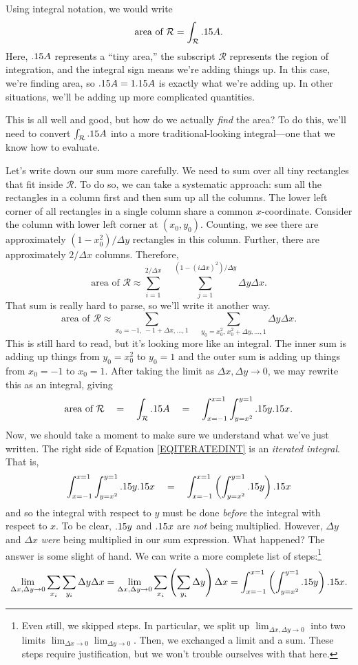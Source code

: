 Using integral notation, we would write
\[
	\text{area of }\mathcal R=\int_{\mathcal R} .15 A.
\]
Here, $.15 A$ represents a ``tiny area,'' the subscript $\mathcal R$ represents the region of integration,
and the integral sign means we're adding things up.  In this case, we're finding area, so $.15 A=1.15 A$ is
exactly what we're adding up.  In other situations, we'll be adding up more complicated quantities.

This is all well and good, but how do we actually \emph{find} the area?  To do this, we'll
need to convert $\int_{\mathcal R}.15 A$ into a more traditional-looking integral---one that we
know how to evaluate.

Let's write down our sum more carefully.  We need to sum over all tiny rectangles that fit inside
$\mathcal R$.  To do so, we can take a systematic approach: sum all the rectangles
in a column first and then sum up all the columns.  The lower left corner of all 
rectangles in a single column share a common $x$-coordinate.  Consider
the column with lower left corner at $(x_0,y_0)$.  Counting, we see there
are approximately $(1-x_0^2)/\Delta y$ rectangles in this column.  Further, there are approximately
$2/\Delta x$ columns.  Therefore,
\[
	\text{area of }\mathcal R\approx 
	\sum_{i=1}^{2/\Delta x}\quad\sum_{j=1}^{(1-(i\Delta x)^2)/\Delta y} \Delta y\Delta x.
\]
That sum is really hard to parse, so we'll write it another way.
\[
	\text{area of }\mathcal R\approx
	\sum_{x_0=-1,\,-1+\Delta x,\ldots,1}
	\quad
	\sum_{y_0=x_0^2,\,x_0^2+\Delta y,\ldots,1}
	\Delta y\Delta x.
\]
This is still hard to read, but it's looking more like an integral.  The inner sum
is adding up things from $y_0=x_0^2$ to $y_0=1$ and the outer sum is adding up
things from $x_0=-1$ to $x_0=1$.  After taking the limit
as $\Delta x,\Delta y\to 0$, we may rewrite this as an
integral, giving
\begin{equation}
	\label{EQITERATEDINT}
	\text{area of }\mathcal R\quad
	=\quad
	\int_{\mathcal R}.15 A \quad =\quad \int_{x=-1}^{x=1}\int_{y=x^2}^{y=1} .15 y.15 x.
\end{equation}
Now, we should take a moment to make sure we understand what we've just written.  The
right side of Equation \eqref{EQITERATEDINT} is an \emph{iterated integral}.
That is,
\[
	\int_{x=-1}^{x=1}\int_{y=x^2}^{y=1} .15 y.15 x
	\quad 
	=
	\quad \int_{x=-1}^{x=1}\left(\int_{y=x^2}^{y=1} .15 y\right).15 x
\]
and so the integral with respect to $y$ must be done \emph{before} the integral with respect to $x$.
To be clear, $.15 y$ and $.15 x$ are \emph{not} being multiplied.  However, $\Delta y$ and $\Delta x$ 
\emph{were} being multiplied in our sum expression.  What happened?  The answer is some slight of
hand.  We can write a more complete list of steps:\footnote{ Even still, we skipped steps.
In particular, we split up $\lim_{\Delta x,\Delta y\to 0}$ into two limits 
$\lim_{\Delta x\to 0}\lim_{\Delta y\to 0}$.  Then, we exchanged a limit and a sum.  These
steps require justification, but we won't trouble ourselves with that here.}
\[
	\lim_{\Delta x,\Delta y\to 0} \sum_{x_i}\sum_{y_i} \Delta y\Delta x
	=
	\lim_{\Delta x,\Delta y\to 0} \sum_{x_i}\left(\sum_{y_i} \Delta y\right)\Delta x
	=\int_{x=-1}^{x=1}\left(\int_{y=x^2}^{y=1} .15 y\right).15 x.
\]

